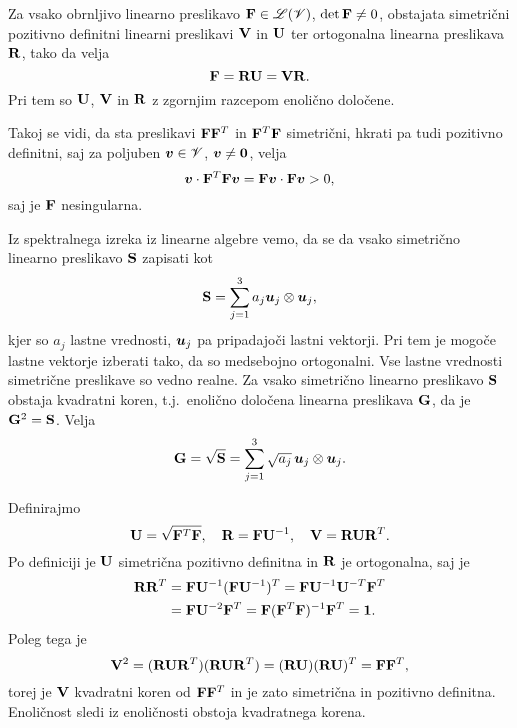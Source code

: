 \begin{izrek}
	Za vsako obrnljivo linearno preslikavo $\mathbf F\in\mathscr L(\mathscr V)$, $\det\mathbf F\neq 0$,
	obstajata simetrični pozitivno definitni linearni preslikavi $\mathbf V$ in $\mathbf U$
	ter ortogonalna linearna preslikava $\mathbf R$, tako da velja
	\[
		\mathbf F=\mathbf R\mathbf U=\mathbf V\mathbf R.
	\]
	Pri tem so $\mathbf U$, $\mathbf V$ in $\mathbf R$ z zgornjim razcepom enolično določene.
\end{izrek}

\proof
	Takoj se vidi, da sta preslikavi $\mathbf F\mathbf F^T$ in $\mathbf F^T\mathbf F$
	simetrični, hkrati pa tudi pozitivno definitni, saj za poljuben $\boldsymbol v\in\mathscr V$,
	$\boldsymbol v\neq\boldsymbol 0$, velja
	\[ \boldsymbol v\cdot\mathbf F^T\mathbf F\boldsymbol v=\mathbf F\boldsymbol v\cdot\mathbf F\boldsymbol v>0, \]
	saj je $\mathbf F$ nesingularna.
	
	Iz spektralnega izreka iz linearne algebre vemo, da se da vsako simetrično
	linearno preslikavo $\mathbf S$ zapisati kot
	\[ \mathbf S=\sum_{j=1}^3 a_j\boldsymbol u_j\otimes\boldsymbol u_j, \]
	kjer so $a_j$ lastne vrednosti, $\boldsymbol u_j$ pa pripadajoči lastni vektorji.
	Pri tem je mogoče lastne vektorje izberati tako, da so medsebojno ortogonalni.
	Vse lastne vrednosti simetrične preslikave so vedno realne. Za vsako
	simetrično linearno preslikavo $\mathbf S$ obstaja kvadratni koren, t.j.~enolično določena linearna
	preslikava $\mathbf G$, da je $\mathbf G^2=\mathbf S$. Velja
	\[ \mathbf G=\sqrt{\mathbf S}=\sum_{j=1}^3 \sqrt{a_j}\,\boldsymbol u_j\otimes\boldsymbol u_j. \]
	
	Definirajmo
	\[
		\mathbf U=\sqrt{\mathbf F^T\mathbf F},\quad\mathbf R=\mathbf F\mathbf U^{-1},\quad
		\mathbf V=\mathbf R\mathbf U\mathbf R^T.
	\]
	Po definiciji je $\mathbf U$ simetrična pozitivno definitna in $\mathbf R$ je ortogonalna, saj je
	\begin{align*}
		\mathbf R\mathbf R^T&=\mathbf F\mathbf U^{-1}(\mathbf F\mathbf U^{-1})^T
		=\mathbf F\mathbf U^{-1}\mathbf U^{-T}\mathbf F^T \\ &=\mathbf F\mathbf U^{-2}\mathbf F^T
		=\mathbf F(\mathbf F^T\mathbf F)^{-1}\mathbf F^T=\mathbf 1.
	\end{align*}
	Poleg tega je
	\[
		\mathbf V^2=(\mathbf R\mathbf U\mathbf R^T)(\mathbf R\mathbf U\mathbf R^T)
		=(\mathbf R\mathbf U)(\mathbf R\mathbf U)^T=\mathbf F\mathbf F^T,
	\]
	torej je $\mathbf V$ kvadratni koren od $\mathbf F\mathbf F^T$ in je zato
	simetrična in pozitivno definitna. Enoličnost sledi iz enoličnosti obstoja
	kvadratnega korena.
\endproof